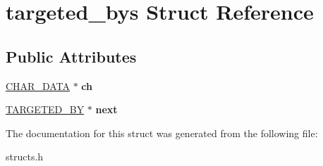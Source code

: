 \hypertarget{structtargeted__bys}{\section{targeted\-\_\-bys Struct Reference}
\label{structtargeted__bys}
}
\subsection*{Public Attributes}
\begin{DoxyCompactItemize}
\item 
\hypertarget{structtargeted__bys_a85f1dccc22c98b0d6245840ef5fd23ce}{\hyperlink{structchar__data}{C\-H\-A\-R\-\_\-\-D\-A\-T\-A} $\ast$ {\bfseries ch}}\label{structtargeted__bys_a85f1dccc22c98b0d6245840ef5fd23ce}

\item 
\hypertarget{structtargeted__bys_a3c0d38fd90dfa918efb00f718b5607ba}{\hyperlink{structtargeted__bys}{T\-A\-R\-G\-E\-T\-E\-D\-\_\-\-B\-Y} $\ast$ {\bfseries next}}\label{structtargeted__bys_a3c0d38fd90dfa918efb00f718b5607ba}

\end{DoxyCompactItemize}


The documentation for this struct was generated from the following file\-:\begin{DoxyCompactItemize}
\item 
structs.\-h\end{DoxyCompactItemize}
